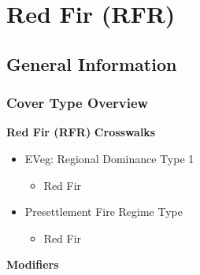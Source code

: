 \newpage
\section{Red Fir (RFR)}
\label{rfr-description}

\subsection*{General Information}

\subsubsection{Cover Type Overview}

\textbf{Red Fir (RFR)}
\newline
\textbf{Crosswalks}
\begin{itemize}
	\item EVeg: Regional Dominance Type 1
	\begin{itemize}
		\item Red Fir
	\end{itemize}

	\item Presettlement Fire Regime Type
	\begin{itemize}
		\item Red Fir
	\end{itemize}
\end{itemize}


\noindent \textbf{Modifiers} \\

